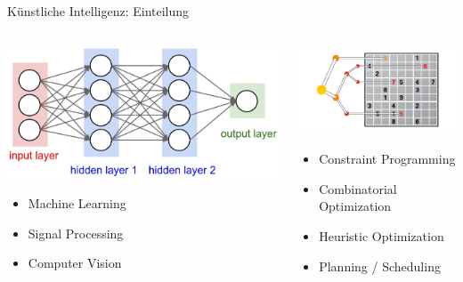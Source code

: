 \begin{frame}{Künstliche Intelligenz: Einteilung}
\begin{columns}[onlytextwidth,T]
    
    \begin{column}{.5\textwidth}
          
    \begin{center}
    \includegraphics[width=.8\textwidth]{img/neuralnet.jpg}
    \end{center}

    \vspace*{4ex}
    
    \begin{itemize}
    \item Machine Learning
    \item Signal Processing
    \item Computer Vision
    \end{itemize}

    \end{column}
    
    \begin{column}{.5\textwidth}
    \begin{center}
    \includegraphics[width=.9\textwidth]{img/discreteopt.png}
    \end{center}
    \begin{itemize}
    \item Constraint Programming
    \item Combinatorial Optimization
    \item Heuristic Optimization
    \item Planning / Scheduling
    \end{itemize}
    
    \end{column}
  \end{columns}
\end{frame}

